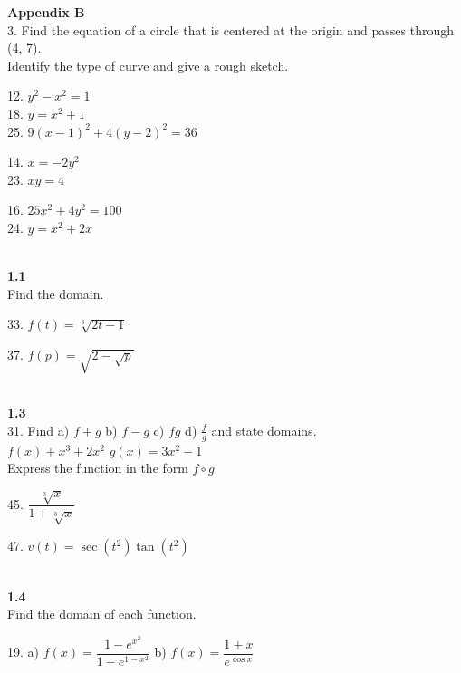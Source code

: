 \documentclass{letter}
\begin{document}
\begin{itemize}
		\textbf{Appendix B}\\
		
		3. Find the equation of a circle that is centered at the origin and passes through (4, 7).\\
		
		Identify the type of curve and give a rough sketch.\\
		\begin{minipage}[t]{0.3\textwidth}
			12. $y^2 - x^2 = 1$\\
			18. $y = x^2 + 1$\\
			25. $9(x-1)^2 + 4(y-2)^2 = 36$
		\end{minipage}
		\begin{minipage}[t]{0.3\textwidth}
			14. $x = -2y^2$\\
			23. $xy = 4$\\
		\end{minipage}
		\begin{minipage}[t]{0.3\textwidth}
			16. $25x^2 + 4y^2 = 100$\\
			24. $y = x^2 + 2x$
		\end{minipage}\\
		
		\textbf{1.1}\\
		
		Find the domain.\\
		\begin{minipage}[t]{0.3\textwidth}
			33. $f(t) = \sqrt[3]{2t-1}$
		\end{minipage}
		\begin{minipage}[t]{0.3\textwidth}
			37. $f(p) = \sqrt{2-\sqrt{p}}$
		\end{minipage}\\
		
		\textbf{1.3}\\
		
		31. Find a) $f+g$ \;\;\;\;b) $f-g$\;\;\;\; c) $fg$ \;\;\;\;d) $\frac{f}{g}$ \;\;\;\;and state domains.\\
		$f(x) + x^3 + 2x^2$\;\;\;\;\;\; $g(x) = 3x^2 - 1$\\
		
		Express the function in the form $f \circ g$\\
		\begin{minipage}[t]{0.3\textwidth}
			45. $\dfrac{\sqrt[3]{x}}{1+\sqrt[3]{x}}$
		\end{minipage}
		\begin{minipage}[t]{0.3\textwidth}
			47. $v(t) = \sec(t^2) \tan(t^2)$
		\end{minipage}\\
		
		\textbf{1.4}\\
		
		Find the domain of each function.
		
		19. a) $f(x) = \dfrac{1 - e^{x^2}}{1-e^{1-x^2}}$ \;\;\;\;\;\;\; b) $f(x) = \dfrac{1+x}{e^{\cos x}}$
	\end{itemize}
\end{document}
